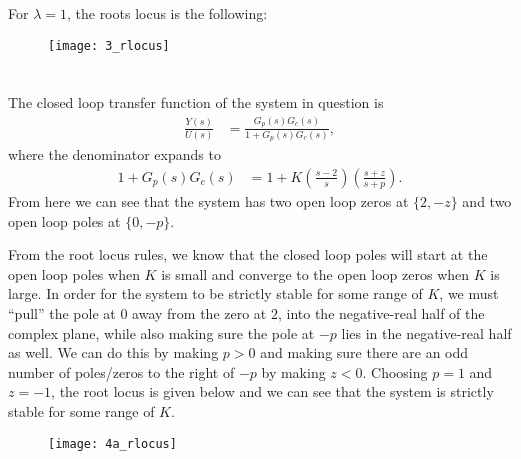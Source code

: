\documentclass[paper=letter, fontsize=11pt]{scrartcl} %
\numberwithin{equation}{section} %
\numberwithin{figure}{section} %
\numberwithin{table}{section} %
\begin{document}
For $\lambda = 1$, the roots locus is the following:
\begin{figure}[h!]
  \centering
  \texttt{[image: 3\_rlocus]}
\end{figure}

\section{}
\subsection{}
The closed loop transfer function of the system in question is 
\begin{align*}
\frac{Y(s)}{U(s)} &= \frac{G_p(s)G_c(s)}{1 + G_p(s)G_c(s)},
\end{align*}
where the denominator expands to
\begin{align*}
1 + G_p(s)G_c(s) &= 1 + K(\frac{s-2}{s})(\frac{s+z}{s+p}).
\end{align*}
From here we can see that the system has two open loop zeros at $\{2, -z\}$ and two open loop
poles at $\{0, -p\}$.

From the root locus rules, we know that the closed loop poles will start at the open loop poles
when $K$ is small and converge to the open loop zeros when $K$ is large. In order for the 
system to be strictly stable for some range of $K$, we must ``pull'' the pole at $0$ away 
from the zero at $2$, into the negative-real half of the complex plane, while also making
sure the pole at $-p$ lies in the negative-real half as well. We can do this
by making $p > 0$ and  making sure there are an odd number of poles/zeros
to the right of $-p$ by making $z < 0$. Choosing $p = 1$ and $z = -1$, the root locus is given
below and we can see that the system is strictly stable for some range of $K$.
\begin{figure}[h!]
  \centering
  \texttt{[image: 4a\_rlocus]}
\end{figure}
\end{document}

